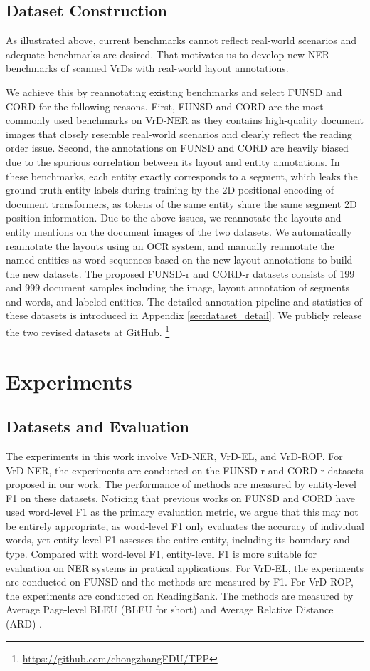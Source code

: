 \documentclass[11pt]{article}
\begin{document}
\subsection{Dataset Construction}

As illustrated above, current benchmarks cannot reflect real-world scenarios and adequate benchmarks are desired. 
That motivates us to develop new NER benchmarks of scanned VrDs with real-world layout annotations. 

We achieve this by reannotating existing benchmarks and select FUNSD \citep{jaume2019funsd} and CORD \citep{park2019cord} for the following reasons. 
First, FUNSD and CORD are the most commonly used benchmarks on VrD-NER as they contains high-quality document images that closely resemble real-world scenarios and clearly reflect the reading order issue.
Second, the annotations on FUNSD and CORD are heavily biased due to the spurious correlation between its layout and entity annotations. In these benchmarks, each entity exactly corresponds to a segment, which leaks the ground truth entity labels during training by the 2D positional encoding of document transformers, as tokens of the same entity share the same segment 2D position information.
Due to the above issues, we reannotate the layouts and entity mentions on the document images of the two datasets.
We automatically reannotate the layouts using an OCR system, and manually reannotate the named entities as word sequences based on the new layout annotations to build the new datasets.   
The proposed FUNSD-r and CORD-r datasets consists of 199 and 999 document samples including the image, layout annotation of segments and words, and labeled entities. 
The detailed annotation pipeline and statistics of these datasets is introduced in Appendix \ref{sec:dataset_detail}. 
We publicly release the two revised datasets at GitHub. \footnote{\url{https://github.com/chongzhangFDU/TPP}} 


\section{Experiments}

\subsection{Datasets and Evaluation}
The experiments in this work involve VrD-NER, VrD-EL, and VrD-ROP. 
For VrD-NER, the experiments are conducted on the FUNSD-r and CORD-r datasets proposed in our work. The performance of methods are measured by entity-level F1 on these datasets.
Noticing that previous works on FUNSD and CORD have used word-level F1 as the primary evaluation metric, we argue that this may not be entirely appropriate, as word-level F1 only evaluates the accuracy of individual words, yet entity-level F1 assesses the entire entity, including its boundary and type. Compared with word-level F1, entity-level F1 is more suitable for evaluation on NER systems in pratical applications.
For VrD-EL, the experiments are conducted on FUNSD and the methods are measured by F1. 
For VrD-ROP, the experiments are conducted on ReadingBank. The methods are measured by Average Page-level BLEU (BLEU for short) and Average Relative Distance (ARD) \citep{wang2021layoutreader}. 
\end{document}
